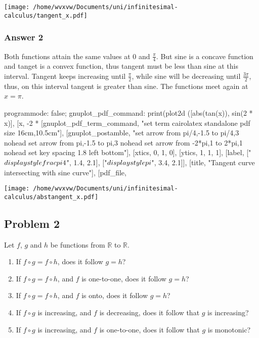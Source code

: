 \documentclass[11pt]{article}
\begin{document}
\texttt{[image: /home/wvxvw/Documents/uni/infinitesimal-calculus/tangent\_x.pdf]}
\subsubsection{Answer 2}
\label{sec-1-1-2}
Both functions attain the same values at 0 and $\frac{\pi}{4}$.  But sine is
a concave function and tanget is a convex function, thus tangent must be less
than sine at this interval.  Tangent keeps increasing until $\frac{\pi}{2}$,
while sine will be decreasing until $\frac{3\pi}{2}$, thus, on this interval
tangent is greater than sine.  The functions meet again at $x=\pi$.

\begin{maxima}
programmode: false;
gnuplot_pdf_command: %
print(plot2d ([abs(tan(x)), sin(2 * x)],
    [x, -2 * %
    [gnuplot_pdf_term_command, 
     "set term cairolatex standalone pdf size 16cm,10.5cm"],
    [gnuplot_postamble,
     "set arrow from pi/4,-1.5 to pi/4,3 nohead
      set arrow from pi,-1.5 to pi,3 nohead
      set arrow from -2*pi,1 to 2*pi,1 nohead
      set key spacing 1.8 left bottom"],
    [xtics, 0, 1, 0], [ytics, 1, 1, 1],
    [label, ["${\\displaystyle \\frac{\\pi}{4}}$", 1.4, 2.1],
            ["${\\displaystyle \\pi}$", 3.4, 2.1]],
    [title, "Tangent curve intersecting with sine curve"],
    [pdf_file, %
\end{maxima}

\texttt{[image: /home/wvxvw/Documents/uni/infinitesimal-calculus/abstangent\_x.pdf]}
\subsection{Problem 2}
\label{sec-1-2}
Let $f$, $g$ and $h$ be functions from $\mathbb{R}$ to $\mathbb{R}$.
\begin{enumerate}
\item If $f \circ g = f \circ h$, does it follow $g = h$?
\item If $f \circ g = f \circ h$, and $f$ is one-to-one, does it follow $g = h$?
\item If $f \circ g = f \circ h$, and $f$ is onto, does it follow $g = h$?
\item If $f \circ g$ is increasing, and $f$ is decreasing, does it follow that
      $g$ is increasing?
\item If $f \circ g$ is increasing, and $f$ is one-to-one, does it follow that
      $g$ is monotonic?
\end{enumerate}
\end{document}
